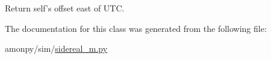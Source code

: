 \begin{DoxyVerb}Return self's offset east of UTC.
\end{DoxyVerb}
 

The documentation for this class was generated from the following file\-:\begin{DoxyCompactItemize}
\item 
amonpy/sim/\hyperlink{sidereal__m_8py}{sidereal\-\_\-m.\-py}\end{DoxyCompactItemize}
